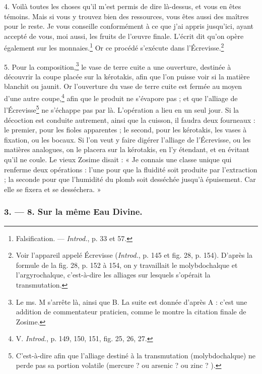 \documentclass[a4paper, 11pt, oneside, polutonikogreek, french]{article}
\begin{document}
4. Voilà toutes les choses qu'il m'est permis de dire là-dessus, et vous en êtes témoins. Mais si vous y trouvez bien des ressources, vous êtes aussi des maîtres pour le reste. Je vous conseille conformément à ce que j'ai appris jusqu'ici, ayant accepté de vous, moi aussi, les fruits de l'œuvre finale. L'écrit dit qu'on opère également sur les monnaies.\footnote{Falsification. --- \emph{Introd.}, p. 33 et 57.} Or ce procédé s'exécute dans l'Écrevisse.\footnote{Voir l'appareil appelé Écrevisse (\emph{Introd.}, p. 145 et fig. 28, p. 154). D'après la formule de la fig. 28, p. 152 à 154, on y travaillait le molybdochalque et l'argyrochalque, c'est-à-dire les alliages sur lesquels s'opérait la transmutation.}

5. Pour la composition,\footnote{Le ms. M s'arrête là, ainsi que B. La suite est donnée d'après A : c'est une addition de commentateur praticien, comme le montre la citation finale de Zosime.} le vase de terre cuite a une ouverture, destinée à découvrir la coupe placée sur la kérotakis, afin que l'on puisse voir si la matière blanchit ou jaunit. Or l'ouverture du vase de terre cuite est fermée au moyen d'une autre coupe,\footnote{V. \emph{Introd.}, p. 149, 150, 151, fig. 25, 26, 27.} afin que le produit ne s'évapore pas ; et que l'alliage de l'Écrevisse\footnote{C'est-à-dire afin que l'alliage destiné à la transmutation (molybdochalque) ne perde pas sa portion volatile (mercure ? ou arsenic ? ou zinc ? ).} ne s'échappe pas par là. L'opération a lieu en un seul jour. Si la décoction est conduite autrement, ainsi que la cuisson, il faudra deux fourneaux : le premier, pour les fioles apparentes ; le second, pour les kérotakis, les vases à fixation, ou les bocaux. Si l'on veut y faire digérer l'alliage de l'Écrevisse, ou les matières analogues, on le placera sur la kérotakis, en l'y étendant, et en évitant qu'il ne coule. Le vieux Zosime disait : « Je connais une classe unique qui renferme deux opérations : l'une pour que la fluidité soit produite par l'extraction ; la seconde pour que l'humidité du plomb soit desséchée jusqu'à épuisement. Car elle se fixera et se desséchera. »

\bigskip
\centerline{\EightStarTaper}
\centerline{\EightStarTaper\EightStarTaper}
\bigskip

\subsubsection{3. --- 8. Sur la même Eau Divine.}
\end{document}
